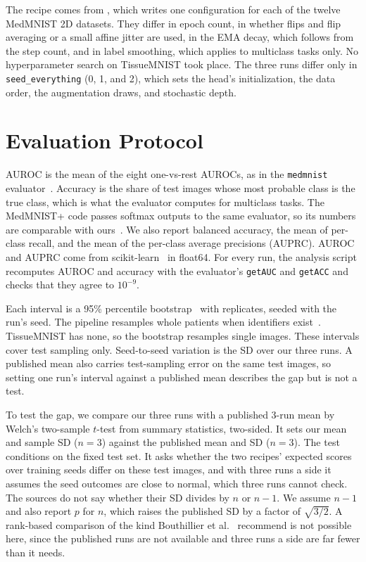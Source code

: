 \documentclass[conference]{IEEEtran}
\newif\ifanycitation
\let\citeAnyKey\cite
\renewcommand{\cite}{\global\anycitationtrue\citeAnyKey}
\begin{document}
The recipe comes from , which writes one configuration
for each of the twelve MedMNIST 2D datasets. They differ in epoch count, in whether flips
and flip averaging or a small affine jitter are used, in the EMA decay, which follows
from the step count, and in label smoothing, which applies to multiclass tasks only. No hyperparameter search on TissueMNIST took place. The three
runs differ only in \texttt{seed\_everything} (0, 1, and 2), which sets the head's
initialization, the data order, the augmentation draws, and stochastic depth.

\section{Evaluation Protocol}
\label{sec:protocol}

AUROC is the mean of the eight one-vs-rest AUROCs, as in the \texttt{medmnist}
evaluator~\cite{medmnist2024evaluator}. Accuracy is the share of test images whose most
probable class is the true class, which is what the evaluator computes for multiclass
tasks. The MedMNIST+ code passes softmax outputs to the same evaluator, so its numbers are
comparable with ours~\cite{doerrich2025medmnistpluscode}. We also report balanced
accuracy, the mean of per-class recall, and the mean of the per-class average precisions
(AUPRC). AUROC and AUPRC come from scikit-learn~\cite{pedregosa2011sklearn} in float64. For
every run, the analysis script recomputes AUROC and accuracy with the evaluator's
\texttt{getAUC} and \texttt{getACC} and checks that they agree to $10^{-9}$.

Each interval is a 95\% percentile bootstrap~\cite{efron1979bootstrap,efron1986bootstrap}
with \bootReplicates{} replicates, seeded with the run's seed. The pipeline resamples
whole patients when identifiers exist~\cite{field2007bootstrap}. TissueMNIST has none, so
the bootstrap resamples single images. These intervals cover test sampling only.
Seed-to-seed variation is the SD over our three runs. A published mean also carries
test-sampling error on the same test images, so setting one run's interval against a
published mean describes the gap but is not a test.

To test the gap, we compare our three runs with a published 3-run mean by Welch's
two-sample $t$-test from summary statistics, two-sided. It sets our mean and sample SD
($n=3$) against the published mean and SD ($n=3$). The test conditions on the fixed test set. It
asks whether the two recipes' expected scores over training seeds differ on these test
images, and with three runs a side it assumes the seed outcomes are close to normal,
which three runs cannot check. The sources do not say whether their SD divides by $n$ or
$n-1$. We assume $n-1$ and also report $p$ for $n$, which raises the published SD by a
factor of $\sqrt{3/2}$. A rank-based comparison of the kind Bouthillier et
al.~\cite{bouthillier2021variance} recommend is not possible here, since the published
runs are not available and three runs a side are far fewer than it needs.
\end{document}
